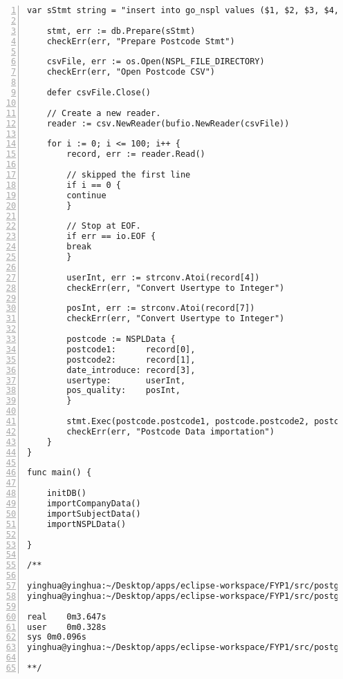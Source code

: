 \begin{lstlisting}[breaklines, frame=single, numbers=left, caption={Source code of Go program}, label=commandline-02]
	var sStmt string = "insert into go_nspl values ($1, $2, $3, $4, $5)"
	
	stmt, err := db.Prepare(sStmt)
	checkErr(err, "Prepare Postcode Stmt")
	
	csvFile, err := os.Open(NSPL_FILE_DIRECTORY)
	checkErr(err, "Open Postcode CSV")
	
	defer csvFile.Close()
	
	// Create a new reader.
	reader := csv.NewReader(bufio.NewReader(csvFile))

	for i := 0; i <= 100; i++ {
		record, err := reader.Read()
		
		// skipped the first line
		if i == 0 {
		continue
		}
		
		// Stop at EOF.
		if err == io.EOF {
		break
		}
		
		userInt, err := strconv.Atoi(record[4])
		checkErr(err, "Convert Usertype to Integer")
		
		posInt, err := strconv.Atoi(record[7])
		checkErr(err, "Convert Usertype to Integer")
	
		postcode := NSPLData {
		postcode1:      record[0],
		postcode2:      record[1],
		date_introduce: record[3],
		usertype:       userInt,
		pos_quality:    posInt,
		}
	
		stmt.Exec(postcode.postcode1, postcode.postcode2, postcode.date_introduce, postcode.usertype, postcode.pos_quality)
		checkErr(err, "Postcode Data importation")
	}
}

func main() {

	initDB()
	importCompanyData()
	importSubjectData()
	importNSPLData()

}

/**

yinghua@yinghua:~/Desktop/apps/eclipse-workspace/FYP1/src/postgres-process$ go build import-csv-psql.go
yinghua@yinghua:~/Desktop/apps/eclipse-workspace/FYP1/src/postgres-process$ time go run import-csv-psql.go

real	0m3.647s
user	0m0.328s
sys	0m0.096s
yinghua@yinghua:~/Desktop/apps/eclipse-workspace/FYP1/src/postgres-process$

**/

\end{lstlisting}
